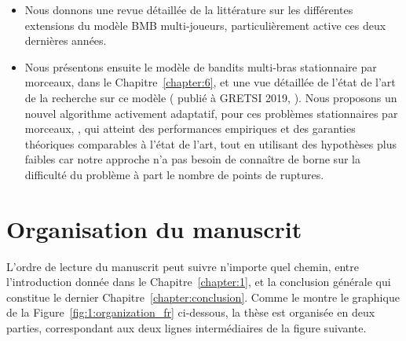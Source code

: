 \begin{resume_fr}
\begin{itemize}
    \item
    Nous donnons une revue détaillée de la littérature sur les différentes extensions du modèle BMB multi-joueurs, particulièrement active ces deux dernières années.

    \item
    Nous présentons ensuite le modèle de bandits multi-bras stationnaire par morceaux, dans le Chapitre~\ref{chapter:6}, et une vue détaillée de l'état de l'art de la recherche sur ce modèle (\cite{Besson2019Gretsi} publié à GRETSI 2019, \cite{Besson2019GLRT}).
    Nous proposons un nouvel algorithme activement adaptatif, pour ces problèmes stationnaires par morceaux, \GLRklUCB, qui atteint des performances empiriques et des garanties théoriques comparables à l'état de l'art, tout en utilisant des hypothèses plus faibles car notre approche n'a pas besoin de connaître de borne sur la difficulté du problème à part le nombre de points de ruptures.

\end{itemize}

\section*{Organisation du manuscrit}

%
L'ordre de lecture du manuscrit peut suivre n'importe quel chemin, entre l'introduction donnée dans le Chapitre~\ref{chapter:1}, et la conclusion générale qui constitue le dernier Chapitre~\ref{chapter:conclusion}.
Comme le montre le graphique de la Figure~\ref{fig:1:organization_fr} ci-dessous,
la thèse est organisée en deux parties, correspondant aux deux lignes intermédiaires de la figure suivante.


\end{resume_fr}
